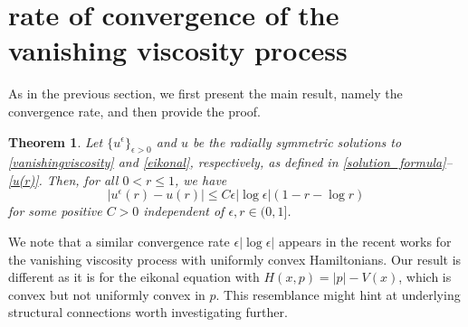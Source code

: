 \documentclass[12pt,reqno]{amsart}
\numberwithin{figure}{section}
\theoremstyle{plain}
\newtheorem{thm}[defn]{Theorem}
\numberwithin{equation}{section}
\begin{document}
\section{rate of convergence of the vanishing viscosity process}
As in the previous section, we first present the main result, namely the convergence rate, and then provide the proof.
\begin{thm}\label{thm:rateconvergence}
    Let $\{ u^\epsilon \}_{\epsilon > 0}$ and $u$ be the radially symmetric solutions to  \eqref{vanishingviscosity} and \eqref{eikonal}, respectively, as defined in \eqref{solution_formula}--\eqref{u(r)}. Then, for all $0<r\le 1$, we have
\[
    |u^{\epsilon}(r)-u(r)|\le C\epsilon|\log \epsilon|(1-r-\log r) 
\]
for some positive $C>0$ independent of $\epsilon,r\in (0,1]$.
\end{thm}
 We note that a similar convergence rate $\epsilon |\log \epsilon|$ appears in the recent works \cite{QianSprekelerTranYu2024, ChaintronDaudin2025, CirantGoffi2025} for the vanishing viscosity process with uniformly convex Hamiltonians.
 Our result is different as it is for the eikonal equation with $H(x,p)=|p|-V(x)$, which is convex but not uniformly convex in $p$. This resemblance might hint at underlying structural connections worth investigating further. 
\end{document}
